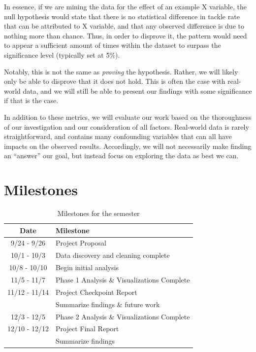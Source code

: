 \documentclass[bibtex, sigconf, hyperref={colorlinks=true,linkcolor=blue,urlcolor=blue}]{acmart}
\begin{document}
In essence, if we are mining the data for the effect of an example X variable,
the null hypothesis would state that there is no statistical difference in
tackle rate that can be attributed to X variable, and that any observed
difference is due to nothing more than chance.  Thus, in order to disprove it,
the pattern would need to appear a sufficient amount of times within the dataset
to surpass the significance level (typically set at 5\%).

Notably, this is not the same as \textit{proving} the hypothesis. Rather, we
will likely only be able to disprove that it does not hold. This is often the
case with real-world data, and we will still be able to present our findings
with some significance if that is the case.

In addition to these metrics, we will evaluate our work based on the
thoroughness of our investigation and our consideration of all factors.
Real-world data is rarely straightforward, and contains many confounding
variables that can all have impacts on the observed results.  Accordingly, we
will not necessarily make finding an “answer” our goal, but instead focus on
exploring the data as best we can.

\section{Milestones}

\begin{table}[H]
  \caption{Milestones for the semester}
  \label{tab:freq}
  \begin{tabular}{c|l}
    \toprule
    Date & Milestone \\
    \midrule
    9/24 - 9/26   & Project Proposal \\
    10/1 - 10/3   & Data discovery and cleaning complete \\
    10/8 - 10/10  & Begin initial analysis \\
    11/5 - 11/7   & Phase 1 Analysis \& Visualizations Complete \\
    11/12 - 11/14 & Project Checkpoint Report \\
                  & Summarize findings \& future work \\
    12/3 - 12/5   & Phase 2 Analysis \& Visualizations Complete \\
    12/10 - 12/12 & Project Final Report \\
                  & Summarize findings \\
    \bottomrule
  \end{tabular}
\end{table}



\nocite{*}
\end{document}

